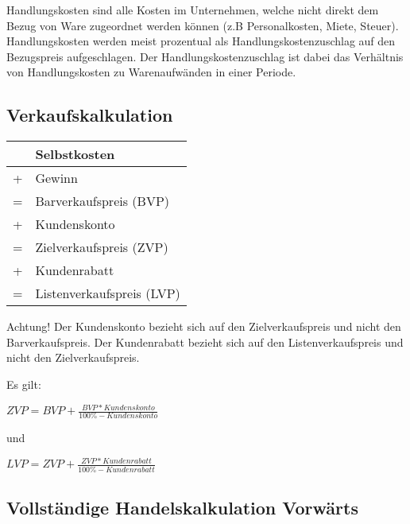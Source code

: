 Handlungskosten sind alle Kosten im Unternehmen, welche nicht direkt dem Bezug von Ware zugeordnet werden können (z.B Personalkosten, Miete, Steuer). Handlungskosten werden meist prozentual als Handlungskostenzuschlag auf den Bezugspreis aufgeschlagen. Der Handlungskostenzuschlag ist dabei das Verhältnis von Handlungskosten zu Warenaufwänden in einer Periode.

\subsection{Verkaufskalkulation}

\begin{table}
    [H]
    \begin{tabular}{c|l}
          & Selbstkosten              \\
        \hline
        + & Gewinn                    \\
        \hline
        = & Barverkaufspreis (BVP)    \\
        \hline
        + & Kundenskonto              \\
        \hline
        = & Zielverkaufspreis (ZVP)   \\
        \hline
        + & Kundenrabatt              \\
        \hline
        = & Listenverkaufspreis (LVP) \\
    \end{tabular}
    \label{tab:verkaufskalkulation}
\end{table}

Achtung! Der Kundenskonto bezieht sich auf den Zielverkaufspreis und nicht den Barverkaufspreis. Der Kundenrabatt bezieht sich auf den Listenverkaufspreis und nicht den Zielverkaufspreis.

Es gilt:

\begin{center}
    $ZVP = BVP + \frac{BVP * Kundenskonto}{100\% - Kundenskonto}$
\end{center}

und

\begin{center}
    $LVP = ZVP + \frac{ZVP * Kundenrabatt}{100\% - Kundenrabatt}$
\end{center}

\subsection{Vollständige Handelskalkulation Vorwärts}

